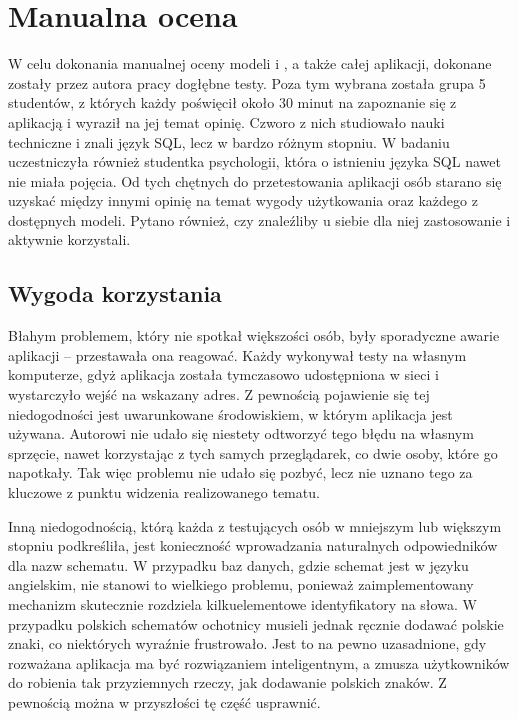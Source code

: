 \section{Manualna ocena}
W celu dokonania manualnej oceny modeli  i , a także całej aplikacji, dokonane zostały przez autora pracy dogłębne testy. Poza tym wybrana została grupa 5 studentów, z których każdy poświęcił około 30 minut na zapoznanie się z aplikacją i wyraził na jej temat opinię. Czworo z nich studiowało nauki techniczne i znali język SQL, lecz w bardzo różnym stopniu. W badaniu uczestniczyła również studentka psychologii, która o istnieniu języka SQL nawet nie miała pojęcia. Od tych chętnych do przetestowania aplikacji osób starano się uzyskać między innymi opinię na temat wygody użytkowania oraz każdego z dostępnych modeli. Pytano również, czy znaleźliby u siebie dla niej zastosowanie i aktywnie korzystali.

\subsection{Wygoda korzystania}
Błahym problemem, który nie spotkał większości osób, były sporadyczne awarie aplikacji -- przestawała ona reagować. Każdy wykonywał testy na własnym komputerze, gdyż aplikacja została tymczasowo udostępniona w sieci i wystarczyło wejść na wskazany adres. Z pewnością pojawienie się tej niedogodności jest uwarunkowane środowiskiem, w którym aplikacja jest używana. Autorowi nie udało się niestety odtworzyć tego błędu na własnym sprzęcie, nawet korzystając z tych samych przeglądarek, co dwie osoby, które go napotkały. Tak więc problemu nie udało się pozbyć, lecz nie uznano tego za kluczowe z punktu widzenia realizowanego tematu.

Inną niedogodnością, którą każda z testujących osób w mniejszym lub większym stopniu podkreśliła, jest konieczność wprowadzania naturalnych odpowiedników dla nazw schematu. W przypadku baz danych, gdzie schemat jest w języku angielskim, nie stanowi to wielkiego problemu, ponieważ zaimplementowany mechanizm skutecznie rozdziela kilkuelementowe identyfikatory na słowa. W przypadku polskich schematów ochotnicy musieli jednak ręcznie dodawać polskie znaki, co niektórych wyraźnie frustrowało. Jest to na pewno uzasadnione, gdy rozważana aplikacja ma być rozwiązaniem inteligentnym, a zmusza użytkowników do robienia tak przyziemnych rzeczy, jak dodawanie polskich znaków. Z pewnością można w przyszłości tę część usprawnić.

